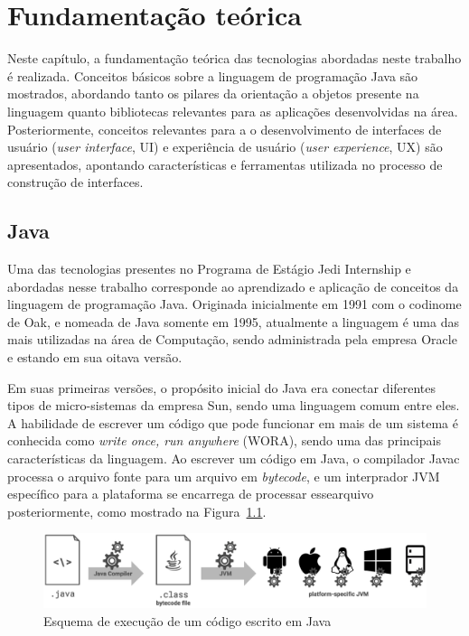 \chapter{Fundamentação teórica}
\label{cap:fundamentacao-teorica}

Neste capítulo, a fundamentação teórica das tecnologias abordadas neste trabalho é realizada. Conceitos básicos sobre a linguagem de programação Java são mostrados, abordando tanto os pilares da orientação a objetos presente na linguagem quanto bibliotecas relevantes para as aplicações desenvolvidas na área. Posteriormente, conceitos relevantes para a o desenvolvimento de interfaces de usuário (\textit{user interface}, UI) e experiência de usuário (\textit{user experience}, UX) são apresentados, apontando características e ferramentas utilizada no processo de construção de interfaces.

\section{Java}
\label{sec:java}

Uma das tecnologias presentes no Programa de Estágio Jedi Internship e abordadas nesse trabalho corresponde ao aprendizado e aplicação de conceitos da linguagem de programação Java. Originada inicialmente em 1991 com o codinome de Oak, e nomeada de Java somente em 1995, atualmente a linguagem é uma das mais utilizadas na área de Computação, sendo administrada pela empresa Oracle e estando em sua oitava versão.

Em suas primeiras versões, o propósito inicial do Java era conectar diferentes tipos de micro-sistemas da empresa Sun, sendo uma linguagem comum entre eles. A habilidade de escrever um código que pode funcionar em mais de um sistema é conhecida como \textit{write once, run anywhere} (WORA), sendo uma das principais características da linguagem. Ao escrever um código em Java, o compilador Javac processa o arquivo fonte para um arquivo em \textit{bytecode}, e um interprador JVM específico para a plataforma se encarrega de processar essearquivo posteriormente, como mostrado na Figura~\ref{fig:java-fluxo}.

\begin{figure}[htb!]
  \centering
  \caption{Esquema de execução de um código escrito em Java}
  \label{fig:java-fluxo}
  \includegraphics[width=\textwidth, keepaspectratio=true]{img/java-fluxo}
\end{figure}

